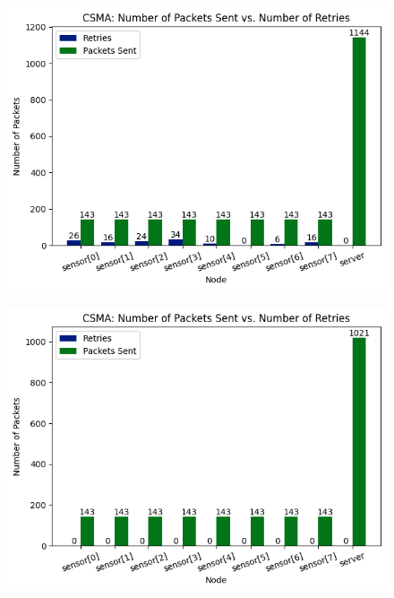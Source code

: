 \begin{frame}
\begin{columns}[T]
\begin{column}{.48\textwidth}
\begin{figure}
                \includegraphics[width=\linewidth]{images/ack.png}
                \label{fig:ack}
                \vspace{-1.25cm}
            \end{figure}
            \begin{figure}
                \centering
                \includegraphics[width=\linewidth]{images/noack.png}
                \label{fig:noack}
            \end{figure}
        \end{column}
    \end{columns}
\end{frame}

